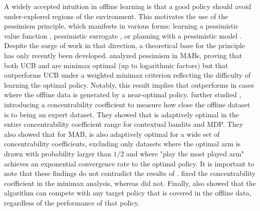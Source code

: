 A widely accepted intuition in offline learning is that a good policy should avoid under-explored regions of the environment. This motivates the use of the pessimism principle, which manifests in various forms: learning a pessimistic value function \citep{swaminathan2015counterfactualriskminimizationlearning,wu2019behaviorregularizedofflinereinforcement,li2022pessimismofflinelinearcontextual}, pessimistic surrogate \citep{buckman2020importancepessimismfixeddatasetpolicy}, or planning with a pessimistic model \citep{MorelPessimistisOfflineLearning,yu2020mopomodelbasedofflinepolicy}. 
Despite the surge of work in that direction, a theoretical base for the principle has only recently been developed. 
\cite{xiao2021optimalitybatchpolicyoptimization} analyzed pessimism in MABs, proving that both UCB and \alglcb are minimax optimal (up to logarithmic factors) but that \alglcb outperforms UCB under a weighted minimax criterion reflecting the difficulty of learning the optimal policy.  Notably, this result implies that \alglcb outperforms \algucb in cases where the offline data is generated by a near-optimal policy. \cite{rashidinejad2023bridgingofflinereinforcementlearning} further studied \alglcb, introducing a concentrability coefficient to measure how close the offline dataset is to being an expert dataset. They showed that \alglcb is adaptively optimal in the entire concentrability coefficient range for contextual bandits and MDP. They also showed that for MAB, \alglcb is also adaptively optimal for a wide set of concentrability coefficients, excluding only datasets where the optimal arm is drawn with probability larger than $1/2$ and where "play the most played arm" achieves an exponential convergence rate to the optimal policy.
It is important to note that these findings do not contradict the results of \cite{xiao2021optimalitybatchpolicyoptimization}.  \cite{rashidinejad2023bridgingofflinereinforcementlearning} fixed the concentrability coefficient in the minimax analysis, whereas \cite{xiao2021optimalitybatchpolicyoptimization} did not. Finally, \cite{rashidinejad2023bridgingofflinereinforcementlearning} also showed that the \alglcb algorithm can compete with any target policy that is covered in the offline data, regardless of the performance of that policy.

